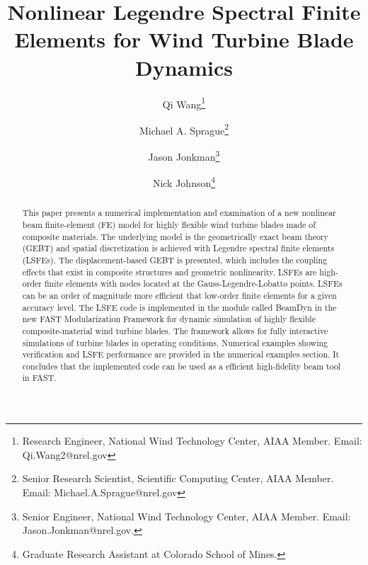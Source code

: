 \documentclass{aiaa-tc}
\title{Nonlinear Legendre Spectral Finite Elements for Wind Turbine Blade Dynamics}
\author[1]{Qi Wang\thanks{Research Engineer, National Wind Technology Center, AIAA Member. Email: Qi.Wang2@nrel.gov}}
\author[1]{Michael A. Sprague\thanks{Senior Research Scientist, Scientific
Computing Center, AIAA Member. Email: Michael.A.Sprague@nrel.gov}}
\author[1]{Jason Jonkman\thanks{Senior Engineer, National Wind Technology
Center, AIAA Member. Email: Jason.Jonkman@nrel.gov.}}
\author[2]{Nick Johnson\thanks{Graduate Research Assistant at Colorado School of Mines.}}
\affil[1]{National Renewable Energy Laboratory, Golden, CO 80401}
\affil[2]{Department of Mechanical Engineering, Colorado School of Mines, Golden, CO 80401}
\renewcommand{\kill}[1]{\textcolor{red}{\sout{#1}}}
\begin{document}
\maketitle

\begin{abstract}
This paper presents a numerical implementation and examination of a new
nonlinear beam finite-element (FE) model for highly flexible wind turbine
blades made of composite materials.  The underlying model is the
geometrically exact beam theory (GEBT) and spatial discretization is
achieved with  Legendre spectral finite elements (LSFEs).  The
displacement-based GEBT is presented, which includes the coupling effects
that exist in composite structures and geometric nonlinearity.   LSFEs are
high-order finite elements with nodes located at the Gauss-Legendre-Lobatto
points.  LSFEs can be an order of magnitude more efficient that low-order
finite elements for a given accuracy level.    The LSFE code is implemented
in the module called BeamDyn in the new FAST Modularization Framework for
dynamic simulation of highly flexible composite-material wind turbine
blades.  The framework allows for fully interactive simulations of turbine
blades in operating conditions.  Numerical examples showing verification and
LSFE performance are provided in the numerical examples section. It
concludes that the implemented code can be used as a efficient high-fidelity
beam tool in FAST.
\end{abstract}


\end{document}
